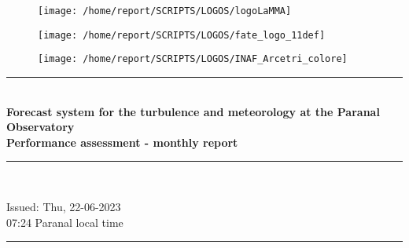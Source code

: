 \documentclass[11pt,english]{article}
\newcommand{\HRule}{\rule{\linewidth}{0.5mm}}
\begin{document}
\begin{figure}
\begin{center}
\hspace{1.5cm}
\parbox{5.5cm}{\texttt{[image: /home/report/SCRIPTS/LOGOS/logoLaMMA]}}
\hspace{.3cm}
\parbox{5.5cm}{\texttt{[image: /home/report/SCRIPTS/LOGOS/fate\_logo\_11def]}}
\hspace{.3cm}
\parbox{5.5cm}{\texttt{[image: /home/report/SCRIPTS/LOGOS/INAF\_Arcetri\_colore]}}
\hspace{.1cm}
\vspace{1.2cm}
\end{center}
\end{figure}

\begin{center}
\HRule \\[0.4cm]
\Huge{\textbf{Forecast system for the turbulence and meteorology at the Paranal Observatory}}
\\[0.4cm]
\LARGE{\textbf{Performance assessment - monthly report}}
\HRule \\[0.4cm]
\end{center}

\begin{center}
\vspace{2cm}\Huge{Issued: Thu, 22-06-2023\\ 07:24 Paranal local time}
\HRule \\[0.1cm]
\end{center}

\clearpage
\end{document}
